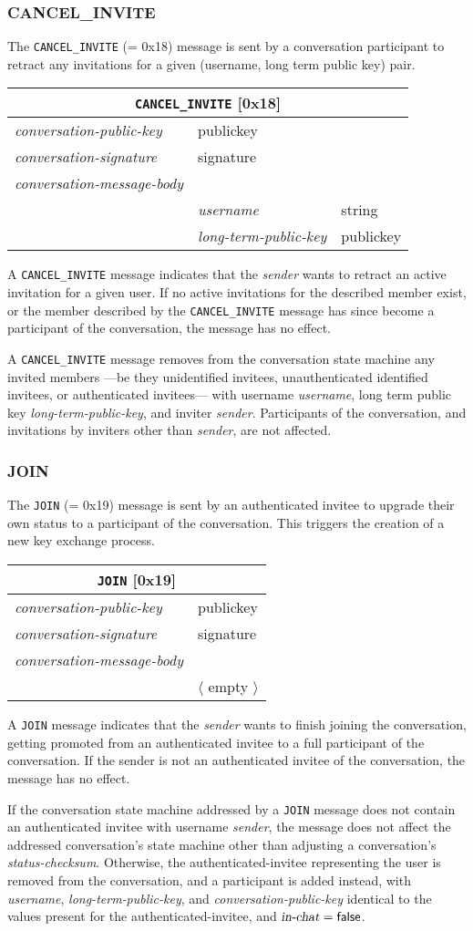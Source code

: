 \documentclass{article}
\def\message#1{\texttt{#1}}
\def\field#1{\textit{#1}}
\def\smfield#1{\textsl{#1}}
\def\type#1{\textsf{#1}}
\newenvironment{conversationmessage}[2]{
\newcommand{\messagefield}[2]{
& \field{##1} & \type{##2} \\
\hline
}
\hspace{2em minus 2em}\begin{tabular}{|l|l|l|}
\hline
\multicolumn{3}{|c|}{\message{#1} [#2]} \\
\hline
\hline
\field{conversation-public-key} & \multicolumn{2}{l|}{\type{publickey}} \\
\hline
\field{conversation-signature} & \multicolumn{2}{l|}{\type{signature}} \\
\hline
\field{conversation-message-body} & \multicolumn{2}{l|}{} \\
\hline
}{
\end{tabular}
}
\newcommand\emptyconversationmessage[2]{
\begin{conversationmessage}{#1}{#2}
& \multicolumn{2}{|l|}{ $\langle$ empty $\rangle$ } \\
\hline
\end{conversationmessage}
}
\begin{document}
\subsubsection{CANCEL\_INVITE}
\label{sec:messages/cancel-invite}

The \message{CANCEL\_INVITE} (= 0x18) message is sent by a conversation participant to retract any invitations for a given (username, long term public key) pair.

\begin{conversationmessage}{CANCEL\_INVITE}{0x18}
\messagefield{username}{string}
\messagefield{long-term-public-key}{publickey}
\end{conversationmessage}

A \message{CANCEL\_INVITE} message indicates that the \field{sender} wants to retract an active invitation for a given user.
If no active invitations for the described member exist, or the member described by the \message{CANCEL\_INVITE} message has since become a participant of the conversation, the message has no effect.

A \message{CANCEL\_INVITE} message removes from the conversation state machine any invited members ---be they unidentified invitees, unauthenticated identified invitees, or authenticated invitees--- with username \field{username}, long term public key \field{long-term-public-key}, and inviter \field{sender}.
Participants of the conversation, and invitations by inviters other than \field{sender}, are not affected.


\subsubsection{JOIN}
\label{sec:messages/join}

The \message{JOIN} (= 0x19) message is sent by an authenticated invitee to upgrade their own status to a participant of the conversation.
This triggers the creation of a new key exchange process.

\emptyconversationmessage{JOIN}{0x19}

A \message{JOIN} message indicates that the \field{sender} wants to finish joining the conversation, getting promoted from an authenticated invitee to a full participant of the conversation.
If the sender is not an authenticated invitee of the conversation, the message has no effect.

If the conversation state machine addressed by a \message{JOIN} message does not contain an authenticated invitee with username \field{sender}, the message does not affect the addressed conversation's state machine other than adjusting a conversation's \smfield{status-checksum}.
Otherwise, the \type{authenticated-invitee} representing the user is removed from the conversation, and a \type{participant} is added instead, with \smfield{username}, \smfield{long-term-public-key}, and \smfield{conversation-public-key} identical to the values present for the \type{authenticated-invitee}, and $\smfield{in-chat} = \textsf{false}$.
\end{document}
